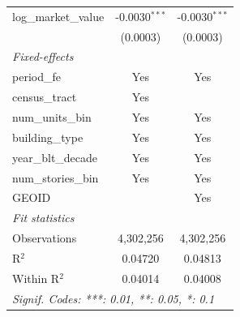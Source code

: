 \begin{tabular}{lcc}
   log\_market\_value                                                  & -0.0030$^{***}$        & -0.0030$^{***}$\\   
                                                                       & (0.0003)               & (0.0003)\\   
   \midrule
   \emph{Fixed-effects}\\
   period\_fe                                                          & Yes                    & Yes\\  
   census\_tract                                                       & Yes                    & \\  
   num\_units\_bin                                                     & Yes                    & Yes\\  
   building\_type                                                      & Yes                    & Yes\\  
   year\_blt\_decade                                                   & Yes                    & Yes\\  
   num\_stories\_bin                                                   & Yes                    & Yes\\  
   GEOID                                                               &                        & Yes\\  
   \midrule
   \emph{Fit statistics}\\
   Observations                                                        & 4,302,256              & 4,302,256\\  
   R$^2$                                                               & 0.04720                & 0.04813\\  
   Within R$^2$                                                        & 0.04014                & 0.04008\\  
   \midrule \midrule
   \multicolumn{3}{l}{\emph{Signif. Codes: ***: 0.01, **: 0.05, *: 0.1}}\\
\end{tabular}
\par\endgroup
\begingroup
\centering
